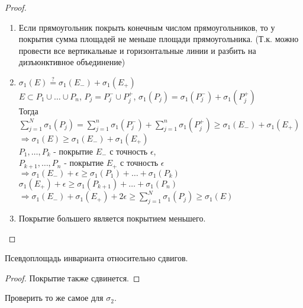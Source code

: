 \begin{proof}
    \begin{enumerate}
        \item Если прямоугольник покрыть конечным числом прямоугольников, то у покрытия сумма площадей не меньше площади прямоугольника.
        (Т.к. можно провести все вертикальные и горизонтальные линии и разбить на дизъюнктивное объединение)

        \item 
        \circled{$\geq$} $\sigma_1(E) \stackrel{?}{=} \sigma_1(E_-) + \sigma_1(E_+)$ \\
        $E \subset P_1 \cup \ldots \cup P_n$,  $P_j = P_j^- \cup P_j^+$,  $\sigma_1(P_j) = \sigma_1(P_j^-) + \sigma_1(P_j^+)$ \\
        Тогда $\sum\limits_{j=1}^N \sigma_1(P_j) = \sum\limits_{j=1}^n \sigma_1(P_j^-) + \sum\limits_{j=1}^n \sigma_1(P_j^+) \geq \sigma_1(E_-) + \sigma_1(E_+)$ \\
        $\Rightarrow \sigma_1(E) \geq \sigma_1(E_-) + \sigma_1(E_+)$ \\
        
        \circled{$\leq$} $P_1, \ldots, P_k$ - покрытие $E_-$ с точность $\epsilon$,  \\
        $P_{k + 1}, \ldots, P_n$ - покрытие $E_+$ с точность $\epsilon$ \\
        $\Rightarrow \sigma_1(E_-) + \epsilon \geq \sigma_1(P_1) + \ldots + \sigma_1(P_k)$ \\
        $\sigma_1(E_+) + \epsilon \geq \sigma_1(P_{k + 1}) + \ldots + \sigma_1(P_n)$ \\
        $\Rightarrow \sigma_1(E_-) + \sigma_1(E_+) + 2\epsilon \geq \sum\limits_{j = 1}^N \sigma_1(P_j) \geq \sigma_1(E)$

        \item Покрытие большего является покрытием меньшего.
        
         
    \end{enumerate}
\end{proof}

\begin{theorem}
    Псевдоплощадь инварианта относительно сдвигов.
\end{theorem}

\begin{proof}
    Покрытие также сдвинется.
\end{proof}

\begin{remark}
    Проверить то же самое для $\sigma_2$.
\end{remark}



